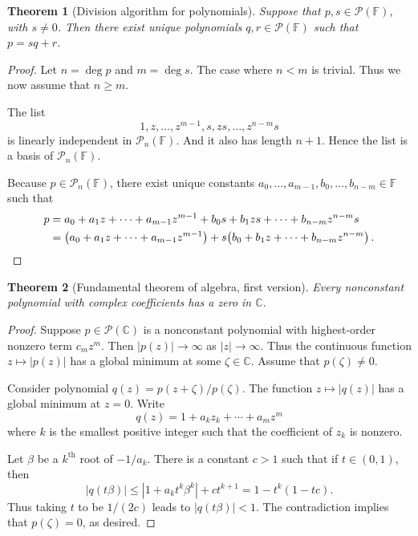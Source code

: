 \documentclass{tufte-handout}
\theoremstyle{plain} %
\newtheorem{thm}{Theorem}
\theoremstyle{definition}
\theoremstyle{remark}
\newcommand{\bra}[1]{\mathopen{}\left(#1\right)}
\newcommand{\abs}[1]{\left|#1\right|}
\newcommand{\C}{\mathbb{C}}
\newcommand{\F}{\mathbb{F}}
\renewcommand{\P}{\mathcal{P}}
\begin{document}
\begin{thm}[Division algorithm for polynomials]
	Suppose that $p,s\in\P(\F)$, with $s\neq0$. Then there exist unique polynomials $q,r\in\P(\F)$ such that $p=sq+r$.%
\end{thm}
\begin{proof}
	Let $n=\deg p$ and $m=\deg s$. The case where $n<m$ is trivial. Thus we now assume that $n\geq m$.

	The list
	\[1,z,\dots,z^{m-1},s,zs,\dots,z^{n-m}s\]
	is linearly independent in $\P_n(\F)$. And it also has length $n+1$. Hence the list is a basis of $\P_n(\F)$.

	Because $p\in\P_n(\F)$, there exist unique constants $a_0,\dots,a_{m-1},b_0,\dots,b_{n-m}\in\F$ such that
	\begin{align*}
		p&=a_0+a_1z+\cdots+a_{m-1}z^{m-1}+b_0s+b_1zs+\cdots+b_{n-m}z^{n-m}s\\
		&=\bra{a_0+a_1z+\cdots+a_{m-1}z^{m-1}}+s\bra{b_0+b_1z+\cdots+b_{n-m}z^{n-m}}.\qedhere
	\end{align*}
\end{proof}

\begin{thm}[Fundamental theorem of algebra, first version]
	Every nonconstant polynomial with complex coefficients has a zero in $\C$.
\end{thm}
\begin{proof}
	Suppose $p\in\P(\C)$ is a nonconstant polynomial with highest-order nonzero term $c_mz^m$. Then $\abs{p(z)}\to\infty$ as $\abs{z}\to\infty$. Thus the continuous function $z\mapsto\abs{p(z)}$ has a global minimum at some $\zeta\in\C$. Assume that $p(\zeta)\neq0$.

	Consider polynomial $q(z)=p(z+\zeta)/p(\zeta)$. The function $z\mapsto\abs{q(z)}$ has a global minimum at $z=0$. Write
	\[q(z)=1+a_kz_k+\cdots+a_mz^m\]
	where $k$ is the smallest positive integer such that the coefficient of $z_k$ is nonzero.
	
	Let $\beta$ be a $k^\text{th}$ root of $-1/a_k$. There is a constant $c>1$ such that if $t\in(0,1)$, then
	\[\abs{q(t\beta)}\leq\abs{1+a_kt^k\beta^k}+ct^{k+1}=1-t^k(1-tc).\]
	Thus taking $t$ to be $1/(2c)$ leads to $\abs{q(t\beta)}<1$. The contradiction implies that $p(\zeta)=0$, as desired.
\end{proof}

\end{document}
